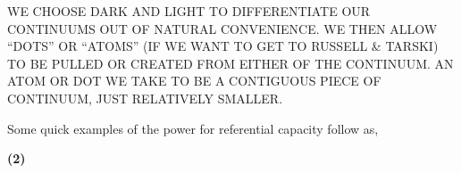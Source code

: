 \documentclass[12pt]{article}
\begin{document}
    WE CHOOSE DARK AND LIGHT TO DIFFERENTIATE OUR CONTINUUMS OUT OF NATURAL
    CONVENIENCE. WE THEN ALLOW ``DOTS'' OR ``ATOMS'' (IF WE WANT TO GET TO
    RUSSELL \& TARSKI) TO BE PULLED OR CREATED FROM EITHER OF THE CONTINUUM.
    AN ATOM OR DOT WE TAKE TO BE A CONTIGUOUS PIECE OF CONTINUUM, JUST RELATIVELY
    SMALLER.

    Some quick examples of the power for referential capacity follow as,

    \textbf{(2)}
    \begin{example}[htbp]
        \centering
        \caption{Description of the drawing.}
        \label{ex:drawing-label}
    \end{example}
\end{document}
